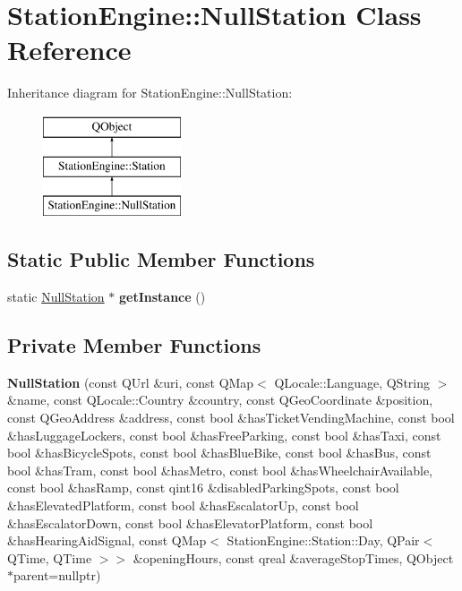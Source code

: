 \hypertarget{classStationEngine_1_1NullStation}{}\section{Station\+Engine\+:\+:Null\+Station Class Reference}
\label{classStationEngine_1_1NullStation}
Inheritance diagram for Station\+Engine\+:\+:Null\+Station\+:\begin{figure}[H]
\begin{center}
\leavevmode
\includegraphics[height=3.000000cm]{classStationEngine_1_1NullStation}
\end{center}
\end{figure}
\subsection*{Static Public Member Functions}
\begin{DoxyCompactItemize}
\item 
\mbox{\label{classStationEngine_1_1NullStation_a620d1cc84bf91ad1c2cadf1f810c9832}} 
static \mbox{\hyperlink{classStationEngine_1_1NullStation}{Null\+Station}} $\ast$ {\bfseries get\+Instance} ()
\end{DoxyCompactItemize}
\subsection*{Private Member Functions}
\begin{DoxyCompactItemize}
\item 
\mbox{\label{classStationEngine_1_1NullStation_a3fb4fcd10147e1b301c74c8391c1ab9b}} 
{\bfseries Null\+Station} (const Q\+Url \&uri, const Q\+Map$<$ Q\+Locale\+::\+Language, Q\+String $>$ \&name, const Q\+Locale\+::\+Country \&country, const Q\+Geo\+Coordinate \&position, const Q\+Geo\+Address \&address, const bool \&has\+Ticket\+Vending\+Machine, const bool \&has\+Luggage\+Lockers, const bool \&has\+Free\+Parking, const bool \&has\+Taxi, const bool \&has\+Bicycle\+Spots, const bool \&has\+Blue\+Bike, const bool \&has\+Bus, const bool \&has\+Tram, const bool \&has\+Metro, const bool \&has\+Wheelchair\+Available, const bool \&has\+Ramp, const qint16 \&disabled\+Parking\+Spots, const bool \&has\+Elevated\+Platform, const bool \&has\+Escalator\+Up, const bool \&has\+Escalator\+Down, const bool \&has\+Elevator\+Platform, const bool \&has\+Hearing\+Aid\+Signal, const Q\+Map$<$ Station\+Engine\+::\+Station\+::\+Day, Q\+Pair$<$ Q\+Time, Q\+Time $>$$>$ \&opening\+Hours, const qreal \&average\+Stop\+Times, Q\+Object $\ast$parent=nullptr)
\end{DoxyCompactItemize}
